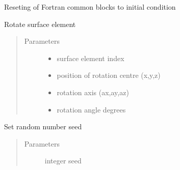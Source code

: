 \documentclass[letterpaper,10pt,english]{sphinxmanual}
\begin{document}

\begin{fulllineitems}
\label{\detokenize{xsrt_functions:xsrt.reset}}
Reseting of Fortran common blocks to initial condition

\end{fulllineitems}


\begin{fulllineitems}
\label{\detokenize{xsrt_functions:xsrt.rotate}}
Rotate surface element
\begin{quote}\begin{description}
\item[{Parameters}] \leavevmode\begin{itemize}
\item {} 
 \textendash{} surface element index

\item {} 
 \textendash{} position of rotation centre (x,y,z)

\item {} 
 \textendash{} rotation axis (ax,ay,az)

\item {} 
 \textendash{} rotation angle degrees

\end{itemize}

\end{description}\end{quote}

\end{fulllineitems}


\begin{fulllineitems}
\label{\detokenize{xsrt_functions:xsrt.rseed}}
Set random number seed
\begin{quote}\begin{description}
\item[{Parameters}] \leavevmode
{} \textendash{} integer seed

\end{description}\end{quote}

\end{fulllineitems}
\end{document}
